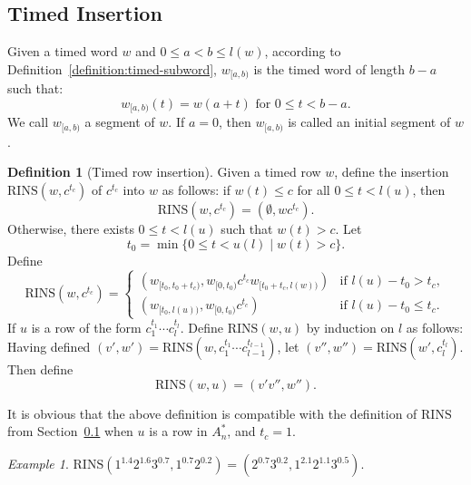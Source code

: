 \documentclass[10pt]{amsproc}
\theoremstyle{definition}
\newtheorem{definition}[theorem]{Definition}
\theoremstyle{remark}
\newtheorem{example}[theorem]{Example}
\newcommand{\rowins}{\mathrm{RINS}}
\begin{document}
\subsection{Timed Insertion}
\label{sec:timed-insertion}
Given a timed word $w$ and $0\leq a < b \leq l(w)$, according to Definition~\ref{definition:timed-subword}, $w_{[a, b)}$ is the timed word of length $b-a$ such that:
\begin{displaymath}
  w_{[a, b)}(t) = w(a+ t) \text{ for } 0\leq t<b-a.
\end{displaymath}
We call $w_{[a,b)}$ a segment of $w$.
If $a=0$, then $w_{[a,b)}$ is called an initial segment of $w$.
\begin{definition}[Timed row insertion]
  \label{definition:timed-row-insertion}
  Given a timed row $w$, define the insertion $\rowins(w, c^{t_c})$ of $c^{t_c}$ into $w$ as follows: if $w(t)\leq c$ for all $0\leq t < l(u)$, then
  \begin{displaymath}
    \rowins(w, c^{t_c}) = (\emptyset, wc^{t_c}).
  \end{displaymath}
  Otherwise, there exists $0\leq t < l(u)$ such that $w(t)>c$.
  Let
  \begin{displaymath}
    t_0 = \min\{0\leq t< u(l)\mid w(t)> c\}.
  \end{displaymath}
  Define
  \begin{displaymath}
    \rowins(w, c^{t_c}) =
    \begin{cases}
      (w_{[t_0, t_0+t_c)}, w_{[0, t_0)}c^{t_c} w_{[t_0+t_c, l(w))}) & \text{if } l(u) - t_0 > t_c,\\
      (w_{[t_0, l(u))}, w_{[0, t_0)} c^{t_c}) & \text{if } l(u) - t_0 \leq t_c.
    \end{cases}
  \end{displaymath}
  If $u$ is a row of the form $c_1^{t_1}\dotsb c_l^{t_l}$.
  Define $\rowins(w,u)$ by induction on $l$ as follows:
  Having defined $(v',w')=\rowins(w,c_1^{t_1}\dotsb c_{l-1}^{t_{l-1}})$,
  let $(v'',w'')=\rowins(w',c_l^{t_l})$.
  Then define
  \begin{displaymath}
    \rowins(w,u) = (v'v'', w'').
  \end{displaymath}
\end{definition}
It is obvious that the above definition is compatible with the definition of $\rowins$ from Section~\ref{sec:timed-insertion} when $u$ is a row in $A_n^*$, and $t_c=1$.
\begin{example}
  \label{example:timed-row-ins}
  $\rowins(1^{1.4}2^{1.6}3^{0.7},1^{0.7}2^{0.2})=(2^{0.7}3^{0.2},1^{2.1}2^{1.1}3^{0.5})$.
\end{example}
\end{document}
